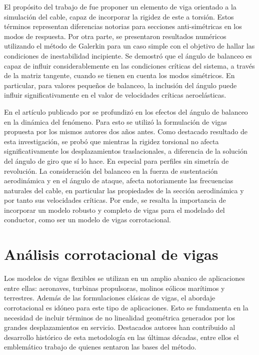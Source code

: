 El propósito del trabajo de \cite{luongo2007linear} fue proponer un elemento de viga orientado a la simulación del cable, capaz de incorporar la rigidez de este a torsión. Estos términos representan diferencias notorias para secciones anti-simétricas en los modos de respuesta. Por otra parte, se presentaron resultados numéricos utilizando el método de Galerkin para un caso simple con el objetivo de hallar las condiciones de inestabilidad incipiente. Se demostró que el ángulo de balanceo es capaz de influir considerablemente en las condiciones críticas del sistema, a través de la matriz tangente, cuando se tienen en cuenta los modos simétricos. En particular, para valores pequeños de balanceo, la inclusión del ángulo puede influir significativamente en el valor de velocidades críticas aeroelásticas.

En el artículo publicado por \cite{luongo2009effect} se profundizó en los efectos del ángulo de balanceo en la dinámica del fenómeno. Para esto se utilizó la formulación de vigas propuesta por los mismos autores dos años antes. Como destacado resultado de esta investigación, se probó que mientras la rigidez torsional no afecta significativamente los desplazamientos traslacionales, a diferencia de la solución del ángulo de giro que sí lo hace. En especial para perfiles sin simetría de revolución. La consideración del balanceo en la fuerza de sustentación aerodinámica y en el ángulo de ataque, afecta notoriamente las frecuencias naturales del cable, en particular las propiedades de la sección aerodinámica y por tanto sus velocidades críticas. Por ende, se resalta la importancia de incorporar un modelo robusto y completo de vigas para el modelado del conductor, como ser un modelo de vigas corrotacional.



\section{Análisis corrotacional de vigas}\label{Sec:EA:Corrotacional}
Los modelos de vigas flexibles se utilizan en un amplio abanico de aplicaciones entre ellas: aeronaves, turbinas propulsoras, molinos eólicos marítimos y terrestres. Además de las formulaciones clásicas de vigas, el abordaje corrotacional es idóneo para este tipo de aplicaciones. Esto se fundamenta en la necesidad de incluir términos de no linealidad geométrica generados por los grandes desplazamientos en servicio. Destacados autores han contribuido al desarrollo histórico de esta metodología en las últimas décadas, entre ellos el emblemático trabajo de \cite{Nour-Omid1991} quienes sentaron las bases del método. 

